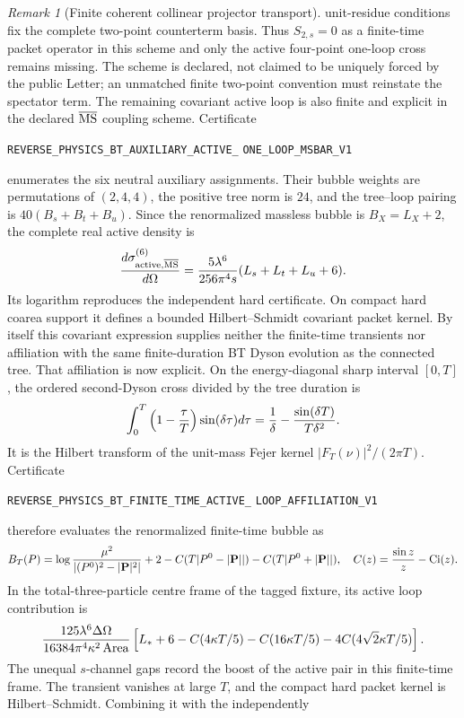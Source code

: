 \documentclass[11pt]{article}
\theoremstyle{definition}
\theoremstyle{remark}
\newtheorem{remark}[theorem]{Remark}
\begin{document}
\begin{remark}[Finite coherent collinear projector transport]
unit-residue conditions fix the complete two-point counterterm basis.  Thus
$S_{2,s}=0$ as a finite-time packet operator in this scheme and only the
active four-point one-loop cross remains missing.  The scheme is declared,
not claimed to be uniquely forced by the public Letter; an unmatched finite
two-point convention must reinstate the spectator term.
The remaining covariant active loop is also finite and explicit in the
declared $\overline{\rm MS}$ coupling scheme.  Certificate
\par\noindent
\texttt{REVERSE\_PHYSICS\_BT\_AUXILIARY\_ACTIVE\_}
\allowbreak\texttt{ONE\_LOOP\_MSBAR\_V1}
\par\noindent
enumerates the six neutral auxiliary assignments.  Their bubble weights are
permutations of $(2,4,4)$, the positive tree norm is $24$, and the tree--loop
pairing is $40(B_s+B_t+B_u)$.  Since the renormalized massless bubble is
$B_X=L_X+2$, the complete real active density is
\[
 {d\sigma_{\rm active,\overline{MS}}^{(6)}\over d\Omega}
 ={5\lambda^6\over256\pi^4s}(L_s+L_t+L_u+6).
\]
Its logarithm reproduces the independent hard certificate.  On compact hard
coarea support it defines a bounded Hilbert--Schmidt covariant packet kernel.
By itself this covariant expression supplies neither the finite-time
transients nor affiliation with the same finite-duration BT Dyson evolution
as the connected tree.
That affiliation is now explicit.  On the energy-diagonal sharp interval
$[0,T]$, the ordered second-Dyson cross divided by the tree duration is
\[
 \int_0^T\left(1-{\tau\over T}\right)\sin(\delta\tau)d\tau
 ={1\over\delta}-{\sin(\delta T)\over T\delta^2}.
\]
It is the Hilbert transform of the unit-mass Fejer kernel
$|F_T(\nu)|^2/(2\pi T)$.  Certificate
\par\noindent
\texttt{REVERSE\_PHYSICS\_BT\_FINITE\_TIME\_ACTIVE\_}
\allowbreak\texttt{LOOP\_AFFILIATION\_V1}
\par\noindent
therefore evaluates the renormalized finite-time bubble as
\[
 B_T(P)=\log{\mu^2\over|(P^0)^2-|\mathbf P|^2|}+2
 -C(T|P^0-|\mathbf P||)-C(T|P^0+|\mathbf P||),
 \quad C(z)={\sin z\over z}-\operatorname{Ci}(z).
\]
In the total-three-particle centre frame of the tagged fixture, its active
loop contribution is
\[
 {125\lambda^6\Delta\Omega\over
 16384\pi^4\kappa^2\operatorname{Area}}
 \left[L_*+6-C(4\kappa T/5)-C(16\kappa T/5)
 -4C(4\sqrt2\kappa T/5)\right].
\]
The unequal $s$-channel gaps record the boost of the active pair in this
finite-time frame.  The transient vanishes at large $T$, and the compact hard
packet kernel is Hilbert--Schmidt.  Combining it with the independently

\end{remark}
\end{document}
